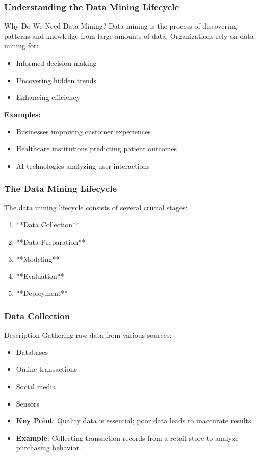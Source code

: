 \documentclass[aspectratio=169]{beamer}
\begin{document}
\begin{frame}[fragile]
    \frametitle{Understanding the Data Mining Lifecycle}
    \begin{block}{Why Do We Need Data Mining?}
        Data mining is the process of discovering patterns and knowledge from large amounts of data. 
        Organizations rely on data mining for:
        \begin{itemize}
            \item Informed decision making
            \item Uncovering hidden trends
            \item Enhancing efficiency
        \end{itemize}
        
        \textbf{Examples:}
        \begin{itemize}
            \item Businesses improving customer experiences
            \item Healthcare institutions predicting patient outcomes
            \item AI technologies analyzing user interactions
        \end{itemize}
    \end{block}
\end{frame}

\begin{frame}[fragile]
    \frametitle{The Data Mining Lifecycle}
    The data mining lifecycle consists of several crucial stages:
    \begin{enumerate}
        \item **Data Collection**
        \item **Data Preparation**
        \item **Modeling**
        \item **Evaluation**
        \item **Deployment**
    \end{enumerate}
\end{frame}

\begin{frame}[fragile]
    \frametitle{Data Collection}
    \begin{block}{Description}
        Gathering raw data from various sources:
        \begin{itemize}
            \item Databases
            \item Online transactions
            \item Social media
            \item Sensors
        \end{itemize}
    \end{block}
    \begin{itemize}
        \item \textbf{Key Point}: Quality data is essential; poor data leads to inaccurate results.
        \item \textbf{Example}: Collecting transaction records from a retail store to analyze purchasing behavior.
    \end{itemize}
\end{frame}
\end{document}
